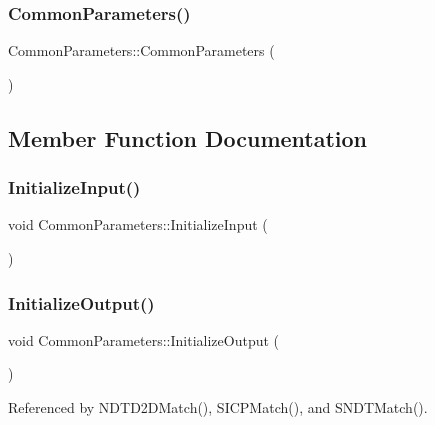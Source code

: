 \subsubsection{\texorpdfstring{Common\+Parameters()}{CommonParameters()}}
{\footnotesize\ttfamily Common\+Parameters\+::\+Common\+Parameters (\begin{DoxyParamCaption}{ }\end{DoxyParamCaption})\hspace{0.3cm}{\ttfamily [inline]}}



\subsection{Member Function Documentation}
\mbox{\label{structCommonParameters_a31cc6bc70619791b6239a57baef5e7f1}} 
\subsubsection{\texorpdfstring{Initialize\+Input()}{InitializeInput()}}
{\footnotesize\ttfamily void Common\+Parameters\+::\+Initialize\+Input (\begin{DoxyParamCaption}{ }\end{DoxyParamCaption})\hspace{0.3cm}{\ttfamily [inline]}}

\mbox{\label{structCommonParameters_a4c459388b8c520c501e81afb0eecfc91}} 
\subsubsection{\texorpdfstring{Initialize\+Output()}{InitializeOutput()}}
{\footnotesize\ttfamily void Common\+Parameters\+::\+Initialize\+Output (\begin{DoxyParamCaption}{ }\end{DoxyParamCaption})\hspace{0.3cm}{\ttfamily [inline]}}



Referenced by N\+D\+T\+D2\+D\+Match(), S\+I\+C\+P\+Match(), and S\+N\+D\+T\+Match().



